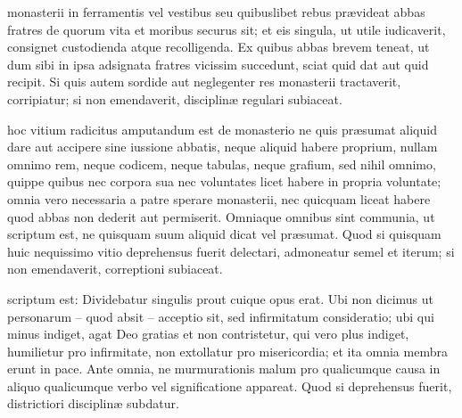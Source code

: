 \documentclass[fontsize=9pt,paper=A6,twoside,BCOR=1mm,DIV=22,headinclude]{scrarticle}
\begin{document}
\begin{multicols}{2}
 monasterii in ferramentis vel vestibus seu quibuslibet rebus prævideat abbas fratres de quorum vita et moribus securus sit; et eis singula, ut utile iudicaverit, consignet custodienda atque recolligenda. Ex quibus abbas brevem teneat, ut dum sibi in ipsa adsignata fratres vicissim succedunt, sciat quid dat aut quid recipit. Si quis autem sordide aut neglegenter res monasterii tractaverit, corripiatur; si non emendaverit, disciplinæ regulari subiaceat. 

 hoc vitium radicitus amputandum est de monasterio ne quis præsumat aliquid dare aut accipere sine iussione abbatis, neque aliquid habere proprium, nullam omnimo rem, neque codicem, neque tabulas, neque grafium, sed nihil omnimo, quippe quibus nec corpora sua nec voluntates licet habere in propria voluntate; omnia vero necessaria a patre sperare monasterii, nec quicquam liceat habere quod abbas non dederit aut permiserit. Omniaque omnibus sint communia, ut scriptum est, ne quisquam suum aliquid dicat vel præsumat. Quod si quisquam huic nequissimo vitio deprehensus fuerit delectari, admoneatur semel et iterum; si non emendaverit, correptioni subiaceat. 

 scriptum est: Dividebatur singulis prout cuique opus erat. Ubi non dicimus ut personarum – quod absit – acceptio sit, sed infirmitatum consideratio; ubi qui minus indiget, agat Deo gratias et non contristetur, qui vero plus indiget, humilietur pro infirmitate, non extollatur pro misericordia; et ita omnia membra erunt in pace. Ante omnia, ne murmurationis malum pro qualicumque causa in aliquo qualicumque verbo vel significatione appareat. Quod si deprehensus fuerit, districtiori disciplinæ subdatur. 


\end{multicols}

\ornamentvi
\end{document}
